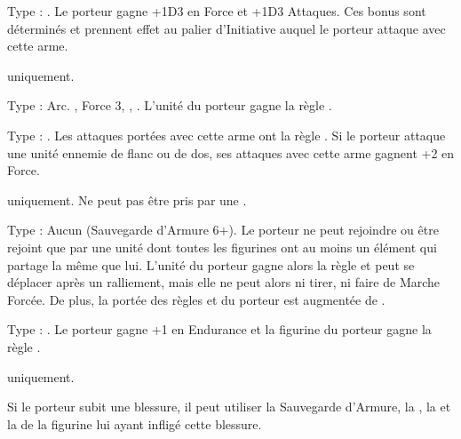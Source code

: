 \startarmymagicalitems

\armymagicalweapons

\startpricelist

Type : \hw{}. Le porteur gagne +1D3 en Force et +1D3 Attaques. Ces bonus sont déterminés et prennent effet au palier d'Initiative auquel le porteur attaque avec cette arme.

 \goblin{} uniquement.

Type : Arc. , Force 3, \lightningattacks{}, . L'unité du porteur gagne la règle \quicktofire{}.

Type : \hw{}. Les attaques portées avec cette arme ont la règle . Si le porteur attaque une unité ennemie de flanc ou de dos, ses attaques avec cette arme gagnent +2 en Force.

\endpricelist

\armymagicalarmour

\startpricelist

\goblin{} uniquement. Ne peut pas être pris par une \largetarget{}.

Type : Aucun (Sauvegarde d'Armure 6+). Le porteur ne peut rejoindre ou être rejoint que par une unité dont toutes les figurines ont au moins un élément qui partage la même \greenhiderace{} que lui. L'unité du porteur gagne alors la règle \vanguard{} et peut se déplacer après un ralliement, mais elle ne peut alors ni tirer, ni faire de Marche Forcée. De plus, la portée des règles \inspiringpresence{} et \holdyourground{} du porteur est augmentée de .

Type : \ha{}. Le porteur gagne +1 en Endurance et la figurine du porteur gagne la règle .

\endpricelist

\armytalismans

\startpricelist

\goblin{} uniquement.

Si le porteur subit une blessure, il peut utiliser la Sauvegarde d'Armure, la \wardsave{}, la \regeneration{} et la \magicresistance{} de la figurine lui ayant infligé cette blessure.

\endpricelist

\armyenchanteditems

